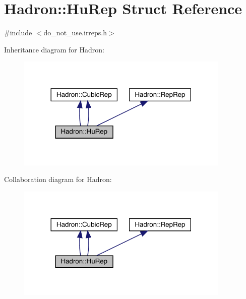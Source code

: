\hypertarget{structHadron_1_1HuRep}{}\section{Hadron\+:\+:Hu\+Rep Struct Reference}
\label{structHadron_1_1HuRep}


{\ttfamily \#include $<$do\+\_\+not\+\_\+use.\+irreps.\+h$>$}



Inheritance diagram for Hadron\+:\nopagebreak
\begin{figure}[H]
\begin{center}
\leavevmode
\includegraphics[width=288pt]{dd/db9/structHadron_1_1HuRep__inherit__graph}
\end{center}
\end{figure}


Collaboration diagram for Hadron\+:\nopagebreak
\begin{figure}[H]
\begin{center}
\leavevmode
\includegraphics[width=288pt]{df/da6/structHadron_1_1HuRep__coll__graph}
\end{center}
\end{figure}
